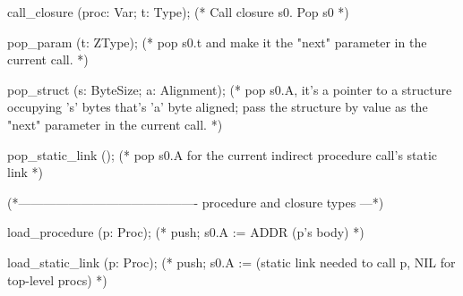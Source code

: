 {call_closure (proc: Var; t: Type);
(* Call closure s0.  Pop s0 *)

pop_param (t: ZType);
(* pop s0.t and make it the "next" parameter in the current call. *)

pop_struct (s: ByteSize;  a: Alignment);
(* pop s0.A, it's a pointer to a structure occupying 's' bytes that's
  'a' byte aligned; pass the structure by value as the "next" parameter
  in the current call. *)

pop_static_link ();
(* pop s0.A for the current indirect procedure call's static link  *)

(*------------------------------------------- procedure and closure types ---*)

load_procedure (p: Proc);
(* push; s0.A := ADDR (p's body) *)

load_static_link (p: Proc);
(* push; s0.A := (static link needed to call p, NIL for top-level procs) *)
}